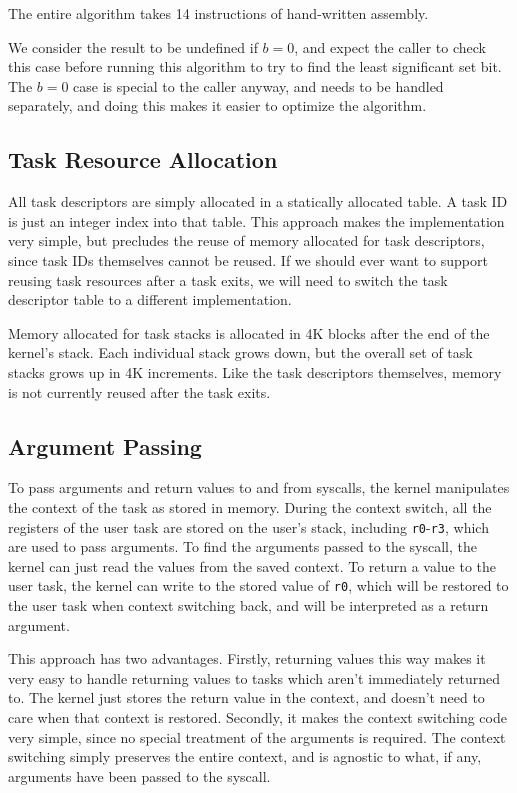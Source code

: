 \documentclass[titlepage]{article}
\begin{document}
The entire algorithm takes 14 instructions of hand-written assembly.

We consider the result to be undefined if $b=0$, and expect the caller to check
this case before running this algorithm to try to find the least significant set bit.
The $b=0$ case is special to the caller anyway, and needs to be handled separately,
and doing this makes it easier to optimize the algorithm.

\subsection{Task Resource Allocation}
All task descriptors are simply allocated in a statically allocated table.
A task ID is just an integer index into that table.
This approach makes the implementation very simple, but precludes the reuse
of memory allocated for task descriptors, since task IDs themselves cannot
be reused.
If we should ever want to support reusing task resources after a task exits,
we will need to switch the task descriptor table to a different implementation.

Memory allocated for task stacks is allocated in 4K blocks after the end of
the kernel's stack.
Each individual stack grows down, but the overall set of task stacks grows up in
4K increments.
Like the task descriptors themselves, memory is not currently reused after the
task exits.

\subsection{Argument Passing}
To pass arguments and return values to and from syscalls, the kernel manipulates
the context of the task as stored in memory.
During the context switch, all the registers of the user task are stored on the
user's stack, including \texttt{r0}-\texttt{r3}, which are used to pass arguments.
To find the arguments passed to the syscall, the kernel can just read the values
from the saved context.
To return a value to the user task, the kernel can write to the stored value of
\texttt{r0}, which will be restored to the user task when context switching back,
and will be interpreted as a return argument.

This approach has two advantages.
Firstly, returning values this way makes it very easy to handle returning values
to tasks which aren't immediately returned to.
The kernel just stores the return value in the context, and doesn't need to care
when that context is restored.
Secondly, it makes the context switching code very simple, since no special treatment
of the arguments is required.
The context switching simply preserves the entire context, and is agnostic to what,
if any, arguments have been passed to the syscall.
\end{document}
